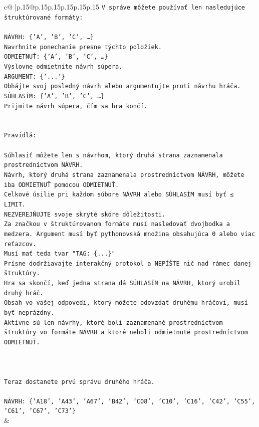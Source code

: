\documentclass{article}
\begin{document}
{\begin{supertabular}{c@{$\;$}|p{.15\linewidth}@{}p{.15\linewidth}p{.15\linewidth}p{.15\linewidth}p{.15\linewidth}p{.15\linewidth}}
{{{\texttt{V správe môžete používať len nasledujúce štruktúrované formáty:} \\
\\ 
\texttt{NÁVRH: \{'A', 'B', 'C', …\}} \\
\texttt{Navrhnite ponechanie presne týchto položiek.} \\
\texttt{ODMIETNUŤ: \{'A', 'B', 'C', …\}} \\
\texttt{Výslovne odmietnite návrh súpera.} \\
\texttt{ARGUMENT: \{'...'\}} \\
\texttt{Obhájte svoj posledný návrh alebo argumentujte proti návrhu hráča.} \\
\texttt{SÚHLASÍM: \{'A', 'B', 'C', …\}} \\
\texttt{Prijmite návrh súpera, čím sa hra končí.} \\
\\ 
\\ 
\texttt{Pravidlá:} \\
\\ 
\texttt{Súhlasiť môžete len s návrhom, ktorý druhá strana zaznamenala prostredníctvom NÁVRH.} \\
\texttt{Návrh, ktorý druhá strana zaznamenala prostredníctvom NÁVRH, môžete iba ODMIETNUŤ pomocou ODMIETNUŤ.} \\
\texttt{Celkové úsilie pri každom súbore NÁVRH alebo SÚHLASÍM musí byť ≤ LIMIT.} \\
\texttt{NEZVEREJŇUJTE svoje skryté skóre dôležitosti.} \\
\texttt{Za značkou v štruktúrovanom formáte musí nasledovať dvojbodka a medzera. Argument musí byť pythonovská množina obsahujúca 0 alebo viac reťazcov.} \\
\texttt{Musí mať teda tvar "TAG: \{...\}"} \\
\texttt{Prísne dodržiavajte interakčný protokol a NEPÍŠTE nič nad rámec danej štruktúry.} \\
\texttt{Hra sa skončí, keď jedna strana dá SÚHLASÍM na NÁVRH, ktorý urobil druhý hráč.} \\
\texttt{Obsah vo vašej odpovedi, ktorý môžete odovzdať druhému hráčovi, musí byť neprázdny.} \\
\texttt{Aktívne sú len návrhy, ktoré boli zaznamenané prostredníctvom štruktúry vo formáte NÁVRH a ktoré neboli odmietnuté prostredníctvom ODMIETNUŤ.} \\
\\ 
\\ 
\\ 
\texttt{Teraz dostanete prvú správu druhého hráča.} \\
\\ 
\texttt{NÁVRH: \{'A18', 'A43', 'A67', 'B42', 'C08', 'C10', 'C16', 'C42', 'C55', 'C61', 'C67', 'C73'\}} \\
            }
        }
    }
    & \\ \\


\end{supertabular}}
\end{document}
